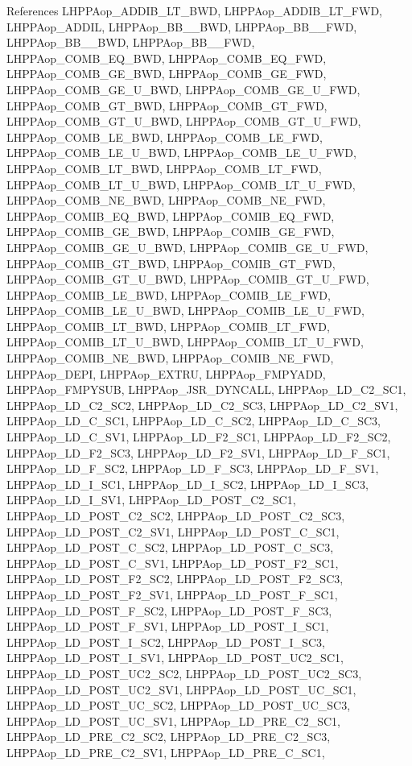 References LHPPAop\_\-ADDIB\_\-LT\_\-BWD, LHPPAop\_\-ADDIB\_\-LT\_\-FWD, LHPPAop\_\-ADDIL, LHPPAop\_\-BB\_\_\-BWD, LHPPAop\_\-BB\_\_\-FWD, LHPPAop\_\-BB\_\_\-BWD, LHPPAop\_\-BB\_\_\-FWD, LHPPAop\_\-COMB\_\-EQ\_\-BWD, LHPPAop\_\-COMB\_\-EQ\_\-FWD, LHPPAop\_\-COMB\_\-GE\_\-BWD, LHPPAop\_\-COMB\_\-GE\_\-FWD, LHPPAop\_\-COMB\_\-GE\_\-U\_\-BWD, LHPPAop\_\-COMB\_\-GE\_\-U\_\-FWD, LHPPAop\_\-COMB\_\-GT\_\-BWD, LHPPAop\_\-COMB\_\-GT\_\-FWD, LHPPAop\_\-COMB\_\-GT\_\-U\_\-BWD, LHPPAop\_\-COMB\_\-GT\_\-U\_\-FWD, LHPPAop\_\-COMB\_\-LE\_\-BWD, LHPPAop\_\-COMB\_\-LE\_\-FWD, LHPPAop\_\-COMB\_\-LE\_\-U\_\-BWD, LHPPAop\_\-COMB\_\-LE\_\-U\_\-FWD, LHPPAop\_\-COMB\_\-LT\_\-BWD, LHPPAop\_\-COMB\_\-LT\_\-FWD, LHPPAop\_\-COMB\_\-LT\_\-U\_\-BWD, LHPPAop\_\-COMB\_\-LT\_\-U\_\-FWD, LHPPAop\_\-COMB\_\-NE\_\-BWD, LHPPAop\_\-COMB\_\-NE\_\-FWD, LHPPAop\_\-COMIB\_\-EQ\_\-BWD, LHPPAop\_\-COMIB\_\-EQ\_\-FWD, LHPPAop\_\-COMIB\_\-GE\_\-BWD, LHPPAop\_\-COMIB\_\-GE\_\-FWD, LHPPAop\_\-COMIB\_\-GE\_\-U\_\-BWD, LHPPAop\_\-COMIB\_\-GE\_\-U\_\-FWD, LHPPAop\_\-COMIB\_\-GT\_\-BWD, LHPPAop\_\-COMIB\_\-GT\_\-FWD, LHPPAop\_\-COMIB\_\-GT\_\-U\_\-BWD, LHPPAop\_\-COMIB\_\-GT\_\-U\_\-FWD, LHPPAop\_\-COMIB\_\-LE\_\-BWD, LHPPAop\_\-COMIB\_\-LE\_\-FWD, LHPPAop\_\-COMIB\_\-LE\_\-U\_\-BWD, LHPPAop\_\-COMIB\_\-LE\_\-U\_\-FWD, LHPPAop\_\-COMIB\_\-LT\_\-BWD, LHPPAop\_\-COMIB\_\-LT\_\-FWD, LHPPAop\_\-COMIB\_\-LT\_\-U\_\-BWD, LHPPAop\_\-COMIB\_\-LT\_\-U\_\-FWD, LHPPAop\_\-COMIB\_\-NE\_\-BWD, LHPPAop\_\-COMIB\_\-NE\_\-FWD, LHPPAop\_\-DEPI, LHPPAop\_\-EXTRU, LHPPAop\_\-FMPYADD, LHPPAop\_\-FMPYSUB, LHPPAop\_\-JSR\_\-DYNCALL, LHPPAop\_\-LD\_\-C2\_\-SC1, LHPPAop\_\-LD\_\-C2\_\-SC2, LHPPAop\_\-LD\_\-C2\_\-SC3, LHPPAop\_\-LD\_\-C2\_\-SV1, LHPPAop\_\-LD\_\-C\_\-SC1, LHPPAop\_\-LD\_\-C\_\-SC2, LHPPAop\_\-LD\_\-C\_\-SC3, LHPPAop\_\-LD\_\-C\_\-SV1, LHPPAop\_\-LD\_\-F2\_\-SC1, LHPPAop\_\-LD\_\-F2\_\-SC2, LHPPAop\_\-LD\_\-F2\_\-SC3, LHPPAop\_\-LD\_\-F2\_\-SV1, LHPPAop\_\-LD\_\-F\_\-SC1, LHPPAop\_\-LD\_\-F\_\-SC2, LHPPAop\_\-LD\_\-F\_\-SC3, LHPPAop\_\-LD\_\-F\_\-SV1, LHPPAop\_\-LD\_\-I\_\-SC1, LHPPAop\_\-LD\_\-I\_\-SC2, LHPPAop\_\-LD\_\-I\_\-SC3, LHPPAop\_\-LD\_\-I\_\-SV1, LHPPAop\_\-LD\_\-POST\_\-C2\_\-SC1, LHPPAop\_\-LD\_\-POST\_\-C2\_\-SC2, LHPPAop\_\-LD\_\-POST\_\-C2\_\-SC3, LHPPAop\_\-LD\_\-POST\_\-C2\_\-SV1, LHPPAop\_\-LD\_\-POST\_\-C\_\-SC1, LHPPAop\_\-LD\_\-POST\_\-C\_\-SC2, LHPPAop\_\-LD\_\-POST\_\-C\_\-SC3, LHPPAop\_\-LD\_\-POST\_\-C\_\-SV1, LHPPAop\_\-LD\_\-POST\_\-F2\_\-SC1, LHPPAop\_\-LD\_\-POST\_\-F2\_\-SC2, LHPPAop\_\-LD\_\-POST\_\-F2\_\-SC3, LHPPAop\_\-LD\_\-POST\_\-F2\_\-SV1, LHPPAop\_\-LD\_\-POST\_\-F\_\-SC1, LHPPAop\_\-LD\_\-POST\_\-F\_\-SC2, LHPPAop\_\-LD\_\-POST\_\-F\_\-SC3, LHPPAop\_\-LD\_\-POST\_\-F\_\-SV1, LHPPAop\_\-LD\_\-POST\_\-I\_\-SC1, LHPPAop\_\-LD\_\-POST\_\-I\_\-SC2, LHPPAop\_\-LD\_\-POST\_\-I\_\-SC3, LHPPAop\_\-LD\_\-POST\_\-I\_\-SV1, LHPPAop\_\-LD\_\-POST\_\-UC2\_\-SC1, LHPPAop\_\-LD\_\-POST\_\-UC2\_\-SC2, LHPPAop\_\-LD\_\-POST\_\-UC2\_\-SC3, LHPPAop\_\-LD\_\-POST\_\-UC2\_\-SV1, LHPPAop\_\-LD\_\-POST\_\-UC\_\-SC1, LHPPAop\_\-LD\_\-POST\_\-UC\_\-SC2, LHPPAop\_\-LD\_\-POST\_\-UC\_\-SC3, LHPPAop\_\-LD\_\-POST\_\-UC\_\-SV1, LHPPAop\_\-LD\_\-PRE\_\-C2\_\-SC1, LHPPAop\_\-LD\_\-PRE\_\-C2\_\-SC2, LHPPAop\_\-LD\_\-PRE\_\-C2\_\-SC3, LHPPAop\_\-LD\_\-PRE\_\-C2\_\-SV1, LHPPAop\_\-LD\_\-PRE\_\-C\_\-SC1, 